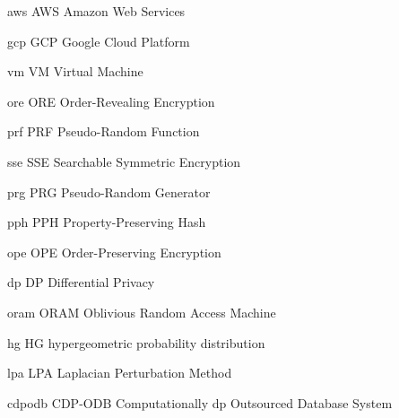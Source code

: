 \newacronym%
	{aws}
	{AWS}
	{Amazon Web Services}

\newacronym%
	{gcp}
	{GCP}
	{Google Cloud Platform}

\newacronym%
	{vm}
	{VM}
	{Virtual Machine}

\newacronym%
	{ore}
	{ORE}
	{Order-Revealing Encryption}

\newacronym%
	{prf}
	{PRF}
	{Pseudo-Random Function}

\newacronym%
	{sse}
	{SSE}
	{Searchable Symmetric Encryption}

\newacronym%
	{prg}
	{PRG}
	{Pseudo-Random Generator}

\newacronym%
	{pph}
	{PPH}
	{Property-Preserving Hash}

\newacronym%
	{ope}
	{OPE}
	{Order-Preserving Encryption}

\newacronym%
	{dp}
	{DP}
	{Differential Privacy}

\newacronym%
	{oram}
	{ORAM}
	{Oblivious Random Access Machine}

\newacronym%
	{hg}
	{HG}
	{hypergeometric probability distribution}

\newacronym%
	{lpa}
	{LPA}
	{Laplacian Perturbation Method}

\newacronym%
	{cdpodb}
	{CDP-ODB}
	{Computationally \acrshort{dp} Outsourced Database System}

